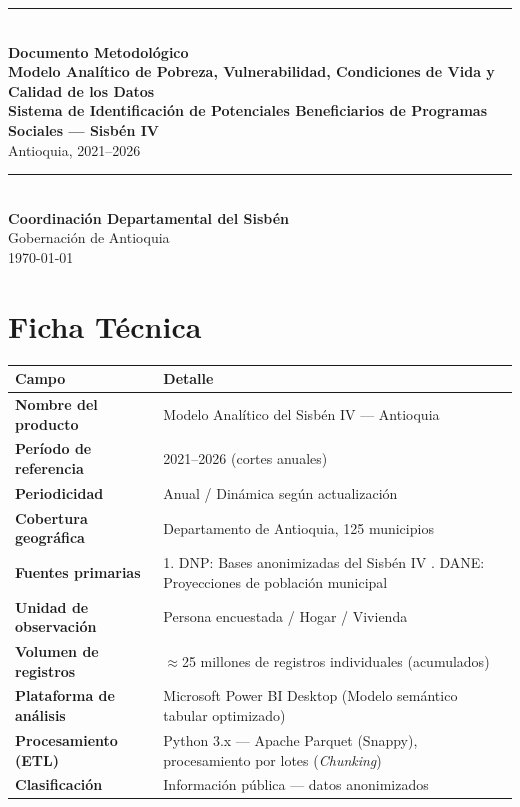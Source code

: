 \documentclass[12pt, a4paper]{article}
\begin{document}
\begin{titlepage}
    \centering
    \vspace*{2cm}
    
    {\color{azul}\rule{\linewidth}{2pt}}\\[0.8em]
    {\huge \textbf{Documento Metodológico}}\\[0.5em]
    {\LARGE \textbf{Modelo Analítico de Pobreza, Vulnerabilidad, Condiciones de Vida y Calidad de los Datos}}\\[0.8em]
    {\large \textbf{Sistema de Identificación de Potenciales Beneficiarios de Programas Sociales — Sisbén IV}}\\[0.5em]
    {\Large Antioquia, 2021–2026}\\[0.8em]
    {\color{azul}\rule{\linewidth}{2pt}}\\[2cm]
    
    {\large \textbf{Coordinación Departamental del Sisbén}}\\
    {\normalsize Gobernación de Antioquia}\\
    \vspace{1.5cm}
    {\normalsize \today}\\
\end{titlepage}

\clearpage
\tableofcontents
\clearpage

\section*{Ficha Técnica}

\begin{longtable}{@{}p{5cm}p{10cm}@{}}
\toprule
\textbf{Campo} & \textbf{Detalle} \\
\midrule
\endhead
\textbf{Nombre del producto} & Modelo Analítico del Sisbén IV --- Antioquia \\
\textbf{Período de referencia} & 2021–2026 (cortes anuales) \\
\textbf{Periodicidad} & Anual / Dinámica según actualización \\
\textbf{Cobertura geográfica} & Departamento de Antioquia, 125 municipios \\
\textbf{Fuentes primarias} & 1. DNP: Bases anonimizadas del Sisbén IV \newline 2. DANE: Proyecciones de población municipal \\
\textbf{Unidad de observación} & Persona encuestada / Hogar / Vivienda \\
\textbf{Volumen de registros} & \(\approx\)25 millones de registros individuales (acumulados) \\
\textbf{Plataforma de análisis} & Microsoft Power BI Desktop (Modelo semántico tabular optimizado) \\
\textbf{Procesamiento (ETL)} & Python 3.x --- Apache Parquet (Snappy), procesamiento por lotes (\textit{Chunking}) \\
\textbf{Clasificación} & Información pública --- datos anonimizados \\
\bottomrule
\end{longtable}
\end{document}
